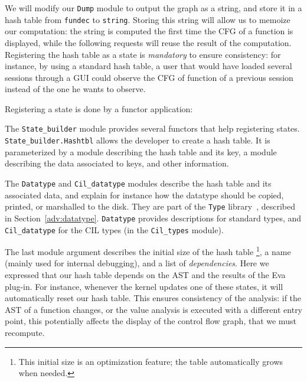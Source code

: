 We will modify our \verb|Dump| module to output the \dottool graph as a string,
and store it in a hash table from \texttt{fundec} to \texttt{string}.
Storing this string will allow us to memoize~\cite{michie68}
our computation: the string is computed the first time the CFG of a
function is displayed, while the following requests will reuse the result of
the computation. Registering the hash table as a \framac state is
\emph{mandatory} to ensure \framac consistency: for instance, by using a
standard \caml hash table, a user that would have loaded several sessions through
a GUI could observe the CFG of function of a previous session instead of the
one he wants to observe.

Registering a state is done by a functor application:


The \texttt{State\_builder} module provides several functors that help
registering states. \texttt{State\_builder.Hashtbl} allows the developer to
create a hash table. It is parameterized by a module describing the hash table
and its key, a module describing the data associated to keys, and
other information.

The \texttt{Datatype} and \texttt{Cil\_datatype} modules describe the
hash table and its associated data, and explain for instance how the
datatype should be copied, printed, or marshalled to the disk. They
are part of the \texttt{Type} library~\cite{signoles:jfla11}, described in
Section~\ref{adv:datatype}. \texttt{Datatype} provides
descriptions for standard \caml types, and \texttt{Cil\_datatype} for
the CIL types (in the \texttt{Cil\_types} module).

The last module argument describes the initial size of the hash table%
\footnote{This initial size is an optimization feature; the table automatically
grows when needed.}, a name (mainly used for internal debugging),
and a list of \emph{dependencies}.
Here we expressed that our hash table depends on the AST and the results of the
\textsf{Eva} plug-in. For instance, whenever the \framac kernel updates one of
these states, it will automatically reset our hash table.
This ensures consistency of the analysis: if the AST of a function changes,
or the value analysis is executed with a different entry point,
this potentially affects the display of the control flow graph,
that we must recompute.

